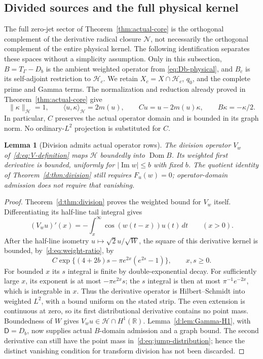\documentclass[11pt,a4paper]{article}
\numberwithin{equation}{section}
\newtheorem{lemma}[theorem]{Lemma}
\theoremstyle{definition}\newtheorem{definition}[theorem]{Definition}
\theoremstyle{remark}\newtheorem{remark}[theorem]{Remark}
\newcommand{\R}{\mathbb R}\newcommand{\C}{\mathbb C}\newcommand{\N}{\mathbb N}
\newcommand{\Hh}{\mathcal H}\newcommand{\Hw}{\mathcal H}
\newcommand{\ip}[2]{\langle#1,#2\rangle}\newcommand{\norm}[1]{\lVert#1\rVert}\newcommand{\abs}[1]{\lvert#1\rvert}
\begin{document}
\subsection{Divided sources and the full physical kernel}\label{rtc:null:section}
The full zero-jet sector of Theorem~\ref{thm:actual-core} is the orthogonal
complement of the derivative radical closure $\mathcal N$, not necessarily
the orthogonal complement of the entire physical kernel.  The following
identification separates these spaces without a simplicity assumption.
Only in this subsection, $B=T_\Gamma-D_b$ is the ambient weighted operator from
\eqref{eq:Db-physical}, and $B_c$ is its self-adjoint restriction to
$\Hh_c$.  We retain $X_c=X\cap\Hh_c$, $q_0$, and the complete prime and
Gamma terms.  The normalization and reduction already proved in
Theorem~\ref{thm:actual-core} give
\[
 \norm{\kappa}_{\Hh}=1,\qquad
 \ip{u}{\kappa}_{\Hh}=2m(u),\qquad
 Cu=u-2m(u)\kappa,\qquad B\kappa=-\kappa/2.
\]
In particular, $C$ preserves the actual operator domain and is bounded in
its graph norm.  No ordinary-$L^2$ projection is substituted for $C$.

\begin{lemma}[Division admits actual operator rows]\label{rtc:null:division}
The division operator $V_w$ of~\eqref{d:eq:V-definition} maps $\Hh$
boundedly into $\operatorname{Dom}B$.  Its weighted first derivative is
bounded, uniformly for $|\operatorname{Im}w|\le b$ with fixed $b$.
The quotient identity of Theorem~\ref{d:thm:division} still requires
$F_u(w)=0$; operator-domain admission does not require that vanishing.
\end{lemma}
\begin{proof}
Theorem~\ref{d:thm:division} proves the weighted bound for $V_w$ itself.
Differentiating its half-line tail integral gives
\[
 (V_wu)'(x)=-\int_x^\infty\cos(w(t-x))u(t)\,dt\qquad(x>0).
\]
After the half-line isometry $u\mapsto\sqrt2u/\sqrt W$, the square of
this derivative kernel is bounded, by~\eqref{d:eq:weight-ratio}, by
\[
 C\exp\{(4+2b)s-\pi e^{2x}(e^{2s}-1)\},\qquad x,s\ge0.
\]
For bounded $x$ its $s$ integral is finite by double-exponential decay.
For sufficiently large $x$, its exponent is at most $-\pi e^{2x}s$;
the $s$ integral is then at most $\pi^{-1}e^{-2x}$, which is integrable
in $x$.  Thus the derivative operator is Hilbert--Schmidt into weighted
$L^2$, with a bound uniform on the stated strip.  The even extension is
continuous at zero, so its first distributional derivative contains no
point mass.  Boundedness of $W$ gives $V_wu\in\Hh\cap H^1(\R)$.
Lemma~\ref{d:lem:Gamma-H1}, with $\mathsf D=D_b$, now supplies actual
$B$-domain admission and a graph bound.  The second derivative can still
have the point mass in~\eqref{d:eq:jump-distribution}; hence the distinct
vanishing condition for transform division has not been discarded.
\end{proof}
\end{document}
